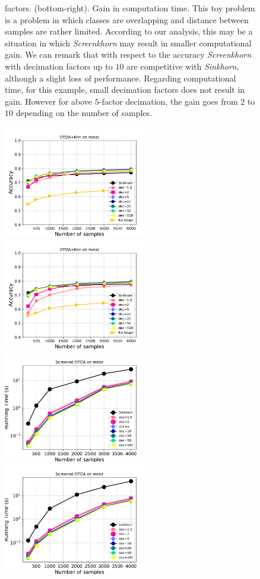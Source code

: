 \begin{figure}[t]
{	factors. (bottom-right). Gain in computation time. This toy problem is a problem in which classes are overlapping and distance between samples are rather limited. According to our analysis, this may be a situation in which \emph{Screenkhorn} may
	result in smaller computational gain. We can remark that with respect to the accuracy
	\emph{Screenkhorn} with decimation factors up to $10$ are competitive with \emph{Sinkhorn}, although a slight loss of performance. Regarding computational time, for this example, small decimation factors does not  result in gain. However for above  $5$-factor decimation, the gain goes from  $2$ to $10$ depending on
	the number of samples. 
	\label{fig:otda}}
\end{figure}


\begin{figure}[t]
	\centering
	\includegraphics[width=6.5cm]{../../figure/da_accur_mnist_regcl1.pdf}
	\includegraphics[width=6.5cm]{../../figure/da_accur_mnist_regcl10.pdf}
	\includegraphics[width=6.5cm]{../../figure/da_time_mnist_regcl1.pdf}
	\includegraphics[width=6.5cm]{../../figure/da_time_mnist_regcl10.pdf}

\end{figure}
